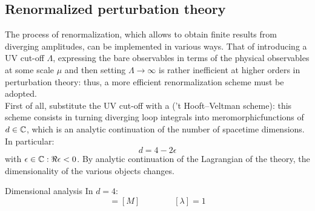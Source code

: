 
\subsection{Renormalized perturbation theory}

The process of renormalization, which allows to obtain finite results from diverging amplitudes, can be implemented in various ways. That of introducing a UV cut-off $ \Lambda $, expressing the bare observables in terms of the physical observables at some scale $ \mu $ and then setting $ \Lambda \rightarrow \infty $ is rather inefficient at higher orders in perturbation theory: thus, a more efficient renormalization scheme must be adopted. \\
First of all, substitute the UV cut-off with a  ('t Hooft--Veltman scheme): this scheme consists in turning diverging loop integrals into meromorphic\footnotemark functions of $ d \in \mathbb{C} $, which is an analytic continuation of the number of spacetime dimensions. In particular:
\begin{equation}
  d = 4 - 2 \epsilon
\end{equation}
with $ \epsilon \in \mathbb{C} : \Re{\epsilon} < 0 $. By analytic continuation of the Lagrangian of the theory, the dimensionality of the various objects changes.


\begin{proposition}{Dimensional analysis}{}
  In $ d = 4 $:
  \begin{equation}
    [\phi] = [M]
    \qquad \qquad
    [\lambda] = 1
  \end{equation}
\end{proposition}

